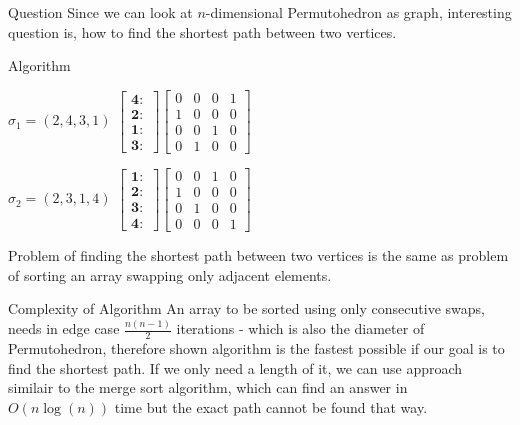 \documentclass[a0paper,portrait]{xebaposter}
\begin{document}
\begin{poster}
\begin{posterbox}[name=quest,column=2,below=edges]{Question}
    Since we can look at  $n$-dimensional Permutohedron as graph, interesting question is, how to find the shortest path between two vertices. 
\end{posterbox}
\begin{posterbox}[name=algorithm, column =1, span =2, below = permutation4]{Algorithm}
\begin{minipage}{0.30\textwidth}
     $\sigma_1 = (2,4,3,1)$  \newline \vfill
     $\begin{bmatrix}
        \mathbf{4: } \\ \mathbf{2: } \\ \mathbf{1: } \\ \mathbf{3: }  
    \end{bmatrix} \begin{bmatrix}
        0 & 0 & 0 & 1 \\ 1 & 0 & 0 & 0 \\ 0 & 0 & 1 & 0 \\ 0 & 1 & 0 & 0
    \end{bmatrix}$ \vfill
\end{minipage}
\begin{minipage}{0.30\textwidth}
    $\sigma_2 = (2,3,1,4)$  \newline \vfill
    $\begin{bmatrix}
        \mathbf{1: } \\ \mathbf{2: } \\ \mathbf{3: } \\ \mathbf{4: }  
    \end{bmatrix} \begin{bmatrix}
          0 & 0 & 1 & 0 \\ 1 & 0 & 0 & 0 \\ 0 & 1 & 0 & 0 \\ 0 & 0 & 0 & 1
    \end{bmatrix} $ 
\end{minipage}
\begin{minipage}{0.30\textwidth}
\vspace{0.35cm}
    Problem of finding the shortest path between two vertices is the same as problem of sorting an array swapping only adjacent elements.  \vspace{0.35cm}
\end{minipage}
    
\end{posterbox}
\begin{posterbox}[name=complexity,below=permutation3,column=0,span=2,above=bottom]{Complexity of Algorithm}
    An array to be sorted using only consecutive swaps, needs in edge case $\frac{n(n-1)}{2}$ iterations - which is also the diameter of Permutohedron, therefore shown algorithm is the fastest possible if our goal is to find the shortest path.
\newline 
If we only need a length of it, we can use approach similair to the merge sort algorithm, which can find an answer in $O(n\log(n))$ time
but the exact path cannot be found that way. 
\end{posterbox}
\end{poster}
\end{document}
